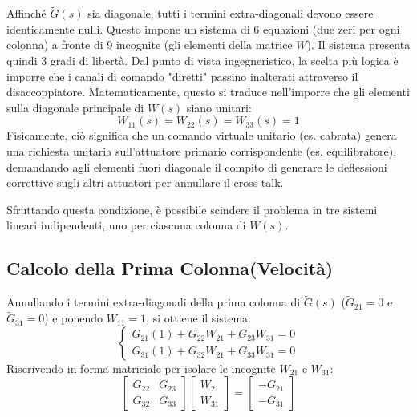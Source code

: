 Affinché $\tilde{G}(s)$ sia diagonale, tutti i termini extra-diagonali devono essere identicamente nulli. Questo impone un sistema di 6 equazioni (due zeri per ogni colonna) a fronte di 9 incognite (gli elementi della matrice $W$).
Il sistema presenta quindi 3 gradi di libertà. Dal punto di vista ingegneristico, la scelta più logica è imporre che i canali di comando "diretti" passino inalterati attraverso il disaccoppiatore. Matematicamente, questo si traduce nell'imporre che gli elementi sulla diagonale principale di $W(s)$ siano unitari:
\begin{equation}
	W_{11}(s) = W_{22}(s) = W_{33}(s) = 1
\end{equation}
Fisicamente, ciò significa che un comando virtuale unitario (es. cabrata) genera una richiesta unitaria sull'attuatore primario corrispondente (es. equilibratore), demandando agli elementi fuori diagonale il compito di generare le deflessioni correttive sugli altri attuatori per annullare il cross-talk.

Sfruttando questa condizione, è possibile scindere il problema in tre sistemi lineari indipendenti, uno per ciascuna colonna di $W(s)$.

\subsection{Calcolo della Prima Colonna(Velocità)}
Annullando i termini extra-diagonali della prima colonna di $\tilde{G}(s)$ ($\tilde{G}_{21} = 0$ e $\tilde{G}_{31} = 0$) e ponendo $W_{11} = 1$, si ottiene il sistema:
\begin{equation}
	\begin{cases}
		G_{21}(1) + G_{22}W_{21} + G_{23}W_{31} = 0 \\
		G_{31}(1) + G_{32}W_{21} + G_{33}W_{31} = 0
	\end{cases}
\end{equation}
Riscrivendo in forma matriciale per isolare le incognite $W_{21}$ e $W_{31}$:
\begin{equation}
	\begin{bmatrix}
		G_{22} & G_{23} \\ 
		G_{32} & G_{33}
	\end{bmatrix}
	\begin{bmatrix}
		W_{21} \\ 
		W_{31}
	\end{bmatrix}
	=
	\begin{bmatrix}
		-G_{21} \\ 
		-G_{31}
	\end{bmatrix}
\end{equation}

